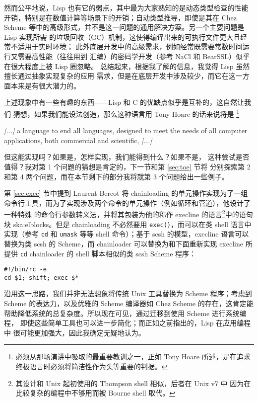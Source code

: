 然而公平地说，Lisp 也有它的弱点，其中最为大家熟知的是动态类型检查的性能
开销，特别是在数值计算等场景下的开销；自动类型推导，即使是其在 Chez Scheme
等中的高级形式，并不是这一问题的通用解决方案。另一个主要问题是 Lisp 实现所需
的垃圾回收（GC）机制，这使得编译出来的可执行文件更大且经常不适用于实时环境；
此外底层开发中的高级需求，例如经常既需要常数时间运行又需要高性能（往往用到
汇编）的密码学开发（参考 NaCl 和 BearSSL）似乎在很大程度上被 Lisp 圈忽略。
总结起来，根据我了解的信息，我觉得 Lisp 虽然擅长通过抽象实现复杂的应用
需求，但是在底层开发中涉及较少，而它在这一方面本来是有很大潜力的。

上述现象中有一些有趣的东西——Lisp 和 C 的优缺点似乎是互补的，这自然让我们
猜想，如果我们能设法创造，那么这种语言用 Tony Hoare 的话来说将是%
\footnote{必须从那场演讲中吸取的最重要教训之一，正如 Tony Hoare
所述，是在追求终极语言时必须将简洁性作为头等重要的判据。}
\begin{quoting}
	\emph{[...]} a language to end all languages, designed to meet the needs
	of all computer applications, both commercial and scientific, \emph{[...]}
\end{quoting}
但这能实现吗？如果是，怎样实现，我们能得到什么？如果不是，
这种尝试是否值得？我对第 1 个问题的猜想是肯定的，下一节和第 \ref{sec:toe} 节将
分别探索第 2 和第 4 两个问题，而在本节剩下的部分我将就第 3 个问题给出一些例子。

第 \ref{sec:exec} 节中提到 Laurent Bercot 将 chainloading 的单元操作实现为了一组
命令行工具，而为了实现涉及两个命令的单元操作（例如循环和管道），他设计了一种特殊
的命令行参数转义法，并将其包装为他的称作 execline 的语言\footnote{其设计和 Unix
起初使用的 Thompson shell 相似，后者在 Unix v7 中
因为在比较复杂的编程中不够用而被 Bourne shell 取代。}中的语句块\cupercite%
{ska:elblocks}。但是 chainloading 不必然要用 \verb|exec()|，而可以在类 shell
语言中实现（参考 \verb|cd| 和 \verb|umask| 等等 shell
命令）；基于 scsh 的模型，execline 语言可以替换为类 scsh
的 Scheme，而 chainloader 可以替换为和下面重新实现 execline 所提供 \verb|cd|
chainloader 的 shell 脚本相似的类 scsh Scheme 程序：
\begin{wquoting}
\begin{Verbatim}
#!/bin/rc -e
cd $1; shift; exec $*
\end{Verbatim}
\end{wquoting}

沿用这一思路，我们并非无法想象将传统 Unix 工具替换为 Scheme 程序；考虑到
Scheme 的表达力，以及优雅的 Scheme 编译器如 Chez Scheme 的存在，这肯定能
帮助降低系统的总复杂度。所以现在可见，通过迁移到使用 Scheme 进行系统编程，
即使这些简单工具也可以进一步简化；而正如之前指出的，Lisp 在应用编程中
很可能更加强大，因此我确定无疑地认为。

